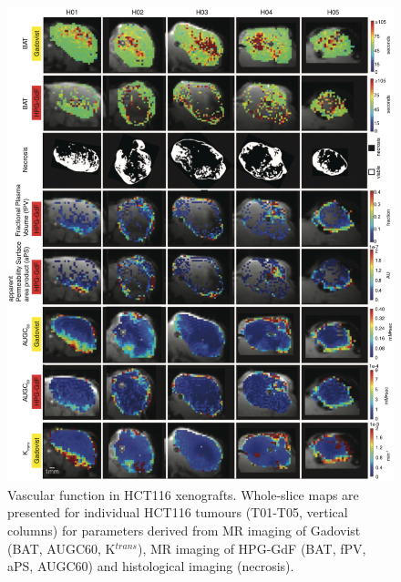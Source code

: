 \begin{figure}[htbp]
 \begin{center}
 \includegraphics[width=\textwidth]{hpg/hpg-paper1-images/hpg_fig7-hct116.png}
 \caption{Vascular function in HCT116 xenografts. Whole-slice maps are presented for individual HCT116 tumours (T01-T05, vertical columns) for parameters derived from MR imaging of Gadovist (BAT, AUGC60, K$^{trans}$), MR imaging of \acs{HPG-GdF} (\acs{BAT}, \acs{fPV}, \acs{aPS}, AUGC60) and histological imaging (necrosis).}
 \label{hpgpaper1:fig7}
 \end{center}
\end{figure}

